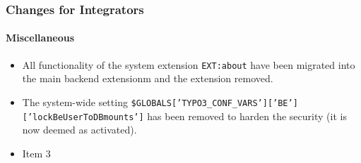 %

\begin{frame}[fragile]
	\frametitle{Changes for Integrators}
	\framesubtitle{Miscellaneous}

	\begin{itemize}
		\item All functionality of the system extension \texttt{EXT:about}
			have been migrated into the main backend extensionm and the
			extension removed.
		\item The system-wide setting
			\small\texttt{\$GLOBALS['TYPO3\_CONF\_VARS']['BE']['lockBeUserToDBmounts']}\normalsize\newline
			has been removed to harden the security (it is now deemed as activated).
		\item Item 3
	\end{itemize}

\end{frame}

